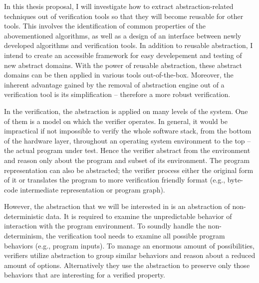 
In this thesis proposal, I will investigate how to extract abstraction-related
techniques out of verification tools so that they will become reusable for
other tools. This involves the identification of common properties of the
abovementioned algorithms, as well as a design of an interface between newly
developed algorithms and verification tools.  In addition to reusable
abstraction, I intend to create an accessible framework for easy develepement
and testing of new abstract domains. With the power of reusable abstraction,
these abstract domains can be then applied in various tools out-of-the-box.
Moreover, the inherent advantage gained by the removal of abstraction engine
out of a verification tool is its simplification -- therefore a more robust
verification.

In the verification, the abstraction is applied on many levels of the system.
One of them is a model on which the verifier operates. In general, it would be
impractical if not impossible to verify the whole software stack, from the
bottom of the hardware layer, throughout an operating system environment to the
top -- the actual program under test. Hence the verifier abstract from the
environment and reason only about the program and subset of its environment.
The program representation can also be abstracted; the verifier process either
the original form of it or translates the program to more verification friendly
format (e.g., byte-code intermediate representation or program graph).

However, the abstraction that we will be interested in is an abstraction of
non-deterministic data. It is required to examine the unpredictable behavior of
interaction with the program environment. To soundly handle the
non-determinism, the verification tool needs to examine all possible program
behaviors (e.g., program inputs). To manage an enormous amount of
possibilities, verifiers utilize abstraction to group similar behaviors and
reason about a reduced amount of options. Alternatively they use the
abstraction to preserve only those behaviors that are interesting for a
verified property.


